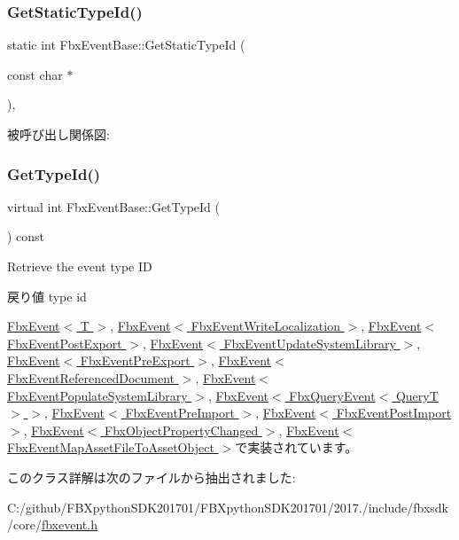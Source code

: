 \subsubsection{\texorpdfstring{Get\+Static\+Type\+Id()}{GetStaticTypeId()}}
{\footnotesize\ttfamily static int Fbx\+Event\+Base\+::\+Get\+Static\+Type\+Id (\begin{DoxyParamCaption}\item[{const char $\ast$}]{ }\end{DoxyParamCaption})\hspace{0.3cm}{\ttfamily [static]}, {\ttfamily [protected]}}

被呼び出し関係図\+:
\mbox{\label{class_fbx_event_base_ac7a558ec38bc899bd705786620582b8b}} 
\subsubsection{\texorpdfstring{Get\+Type\+Id()}{GetTypeId()}}
{\footnotesize\ttfamily virtual int Fbx\+Event\+Base\+::\+Get\+Type\+Id (\begin{DoxyParamCaption}{ }\end{DoxyParamCaption}) const\hspace{0.3cm}{\ttfamily [pure virtual]}}

Retrieve the event type ID \begin{DoxyReturn}{戻り値}
type id 
\end{DoxyReturn}


\hyperlink{class_fbx_event_a96ae7ea5ee46f040f6493f6acecd5bba}{Fbx\+Event$<$ T $>$}, \hyperlink{class_fbx_event_a96ae7ea5ee46f040f6493f6acecd5bba}{Fbx\+Event$<$ Fbx\+Event\+Write\+Localization $>$}, \hyperlink{class_fbx_event_a96ae7ea5ee46f040f6493f6acecd5bba}{Fbx\+Event$<$ Fbx\+Event\+Post\+Export $>$}, \hyperlink{class_fbx_event_a96ae7ea5ee46f040f6493f6acecd5bba}{Fbx\+Event$<$ Fbx\+Event\+Update\+System\+Library $>$}, \hyperlink{class_fbx_event_a96ae7ea5ee46f040f6493f6acecd5bba}{Fbx\+Event$<$ Fbx\+Event\+Pre\+Export $>$}, \hyperlink{class_fbx_event_a96ae7ea5ee46f040f6493f6acecd5bba}{Fbx\+Event$<$ Fbx\+Event\+Referenced\+Document $>$}, \hyperlink{class_fbx_event_a96ae7ea5ee46f040f6493f6acecd5bba}{Fbx\+Event$<$ Fbx\+Event\+Populate\+System\+Library $>$}, \hyperlink{class_fbx_event_a96ae7ea5ee46f040f6493f6acecd5bba}{Fbx\+Event$<$ Fbx\+Query\+Event$<$ Query\+T $>$ $>$}, \hyperlink{class_fbx_event_a96ae7ea5ee46f040f6493f6acecd5bba}{Fbx\+Event$<$ Fbx\+Event\+Pre\+Import $>$}, \hyperlink{class_fbx_event_a96ae7ea5ee46f040f6493f6acecd5bba}{Fbx\+Event$<$ Fbx\+Event\+Post\+Import $>$}, \hyperlink{class_fbx_event_a96ae7ea5ee46f040f6493f6acecd5bba}{Fbx\+Event$<$ Fbx\+Object\+Property\+Changed $>$}, \hyperlink{class_fbx_event_a96ae7ea5ee46f040f6493f6acecd5bba}{Fbx\+Event$<$ Fbx\+Event\+Map\+Asset\+File\+To\+Asset\+Object $>$}で実装されています。



このクラス詳解は次のファイルから抽出されました\+:\begin{DoxyCompactItemize}
\item 
C\+:/github/\+F\+B\+Xpython\+S\+D\+K201701/\+F\+B\+Xpython\+S\+D\+K201701/2017./include/fbxsdk/core/\hyperlink{fbxevent_8h}{fbxevent.\+h}\end{DoxyCompactItemize}
